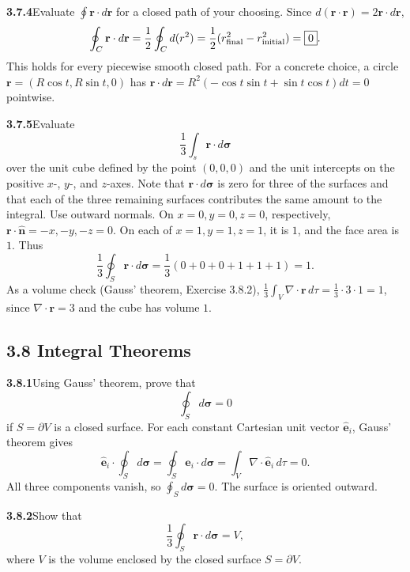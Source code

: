 \par\bigskip
\noindent\textbf{3.7.4}\quad Evaluate $\oint\mathbf{r}\cdot d\mathbf{r}$ for a
closed path of your choosing.
\solution
Since $d(\mathbf r\cdot\mathbf r)=2\mathbf r\cdot d\mathbf r$,
\[
\oint_C\mathbf r\cdot d\mathbf r
=\frac12\oint_Cd(r^2)=\frac12(r_{\rm final}^2-r_{\rm initial}^2)
=\boxed0.
\]
This holds for every piecewise smooth closed path. For a concrete
choice, a circle $\mathbf r=(R\cos t,R\sin t,0)$ has
$\mathbf r\cdot d\mathbf r=R^2(-\cos t\sin t+\sin t\cos t)dt=0$
pointwise.

\par\bigskip
\noindent\textbf{3.7.5}\quad Evaluate
\[
\frac{1}{3}\int_{s}\mathbf{r}\cdot d\boldsymbol{\sigma}
\]
over the unit cube defined by the point $(0,0,0)$ and the unit intercepts on
the positive $x$-, $y$-, and $z$-axes. Note that $\mathbf{r}\cdot
d\boldsymbol{\sigma}$ is zero for three of the surfaces and that each of the
three remaining surfaces contributes the same amount to the integral.
\solution
Use outward normals. On $x=0,y=0,z=0$, respectively,
$\mathbf r\cdot\hat{\mathbf n}=-x,-y,-z=0$.
On each of $x=1,y=1,z=1$, it is $1$, and the face area is $1$.
Thus
\[
\boxed{\frac13\oint_S\mathbf r\cdot d\boldsymbol\sigma
=\frac13(0+0+0+1+1+1)=1}.
\]
As a volume check (Gauss' theorem, Exercise 3.8.2),
$\frac13\int_V\nabla\cdot\mathbf r\,d\tau=\frac13\cdot3\cdot1=1$, since
$\nabla\cdot\mathbf r=3$ and the cube has volume $1$.

\subsection*{3.8 Integral Theorems}

\par\bigskip
\noindent\textbf{3.8.1}\quad Using Gauss' theorem, prove that
\[
\oint_{S}d\boldsymbol{\sigma}=0
\]
if $S=\partial V$ is a closed surface.
\solution
For each constant Cartesian unit vector $\hat{\mathbf e}_i$,
Gauss' theorem gives
\[
\hat{\mathbf e}_i\cdot\oint_Sd\boldsymbol\sigma
=\oint_S\hat{\mathbf e}_i\cdot d\boldsymbol\sigma
=\int_V\nabla\cdot\hat{\mathbf e}_i\,d\tau=0.
\]
All three components vanish, so $\boxed{\oint_Sd\boldsymbol\sigma=0}$.
The surface is oriented outward.

\par\bigskip
\noindent\textbf{3.8.2}\quad Show that
\[
\frac{1}{3}\oint_{S}\mathbf{r}\cdot d\boldsymbol{\sigma}=V,
\]
where $V$ is the volume enclosed by the closed surface $S=\partial V$.

